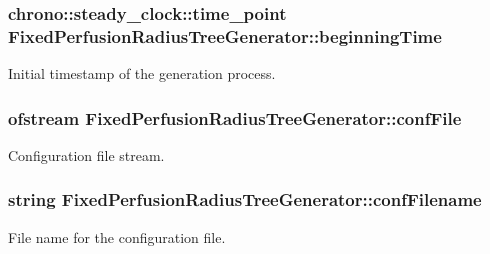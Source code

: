 \subsubsection[{\texorpdfstring{beginning\+Time}{beginningTime}}]{\setlength{\rightskip}{0pt plus 5cm}chrono\+::steady\+\_\+clock\+::time\+\_\+point Fixed\+Perfusion\+Radius\+Tree\+Generator\+::beginning\+Time\hspace{0.3cm}{\ttfamily [protected]}}\hypertarget{class_fixed_perfusion_radius_tree_generator_ab1945f73c7d8ac571c34b68792d5d317}{}\label{class_fixed_perfusion_radius_tree_generator_ab1945f73c7d8ac571c34b68792d5d317}
Initial timestamp of the generation process. 
\subsubsection[{\texorpdfstring{conf\+File}{confFile}}]{\setlength{\rightskip}{0pt plus 5cm}ofstream Fixed\+Perfusion\+Radius\+Tree\+Generator\+::conf\+File\hspace{0.3cm}{\ttfamily [protected]}}\hypertarget{class_fixed_perfusion_radius_tree_generator_acccbb50a7aa221b58e80e47515650a5a}{}\label{class_fixed_perfusion_radius_tree_generator_acccbb50a7aa221b58e80e47515650a5a}
Configuration file stream. 
\subsubsection[{\texorpdfstring{conf\+Filename}{confFilename}}]{\setlength{\rightskip}{0pt plus 5cm}string Fixed\+Perfusion\+Radius\+Tree\+Generator\+::conf\+Filename\hspace{0.3cm}{\ttfamily [private]}}\hypertarget{class_fixed_perfusion_radius_tree_generator_a429c60ad818d28d0a50167beaecf60b9}{}\label{class_fixed_perfusion_radius_tree_generator_a429c60ad818d28d0a50167beaecf60b9}
File name for the configuration file. 
